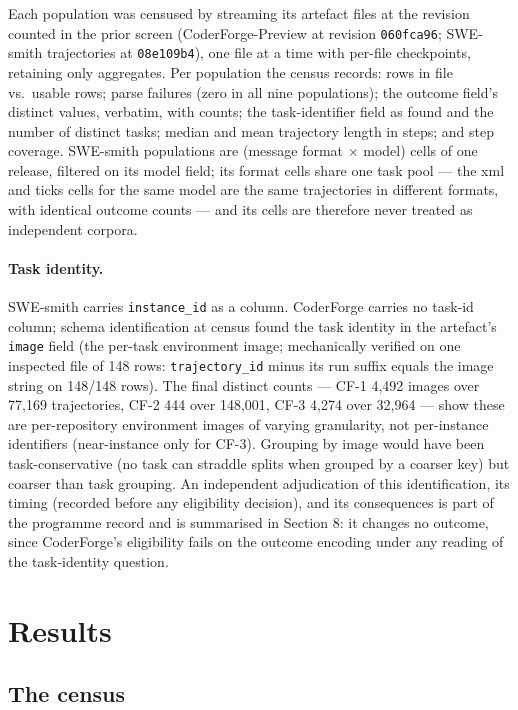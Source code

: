 \documentclass[11pt]{article}
\begin{document}
Each population was censused by streaming its artefact files at
the revision counted in the prior screen (CoderForge-Preview at
revision \texttt{060fca96}; SWE-smith trajectories at
\texttt{08e109b4}), one file at a time with per-file checkpoints,
retaining only aggregates. Per population the census records:
rows in file vs.\ usable rows; parse failures (zero in all nine
populations); the outcome field's distinct values, verbatim,
with counts; the task-identifier field as found and the number
of distinct tasks; median and mean trajectory length in steps;
and step coverage. SWE-smith populations are (message format
$\times$ model) cells of one release, filtered on its model
field; its format cells share one task pool --- the xml and
ticks cells for the same model are the same trajectories in
different formats, with identical outcome counts --- and its
cells are therefore never treated as independent corpora.

\paragraph{Task identity.} SWE-smith carries \texttt{instance\_id}
as a column. CoderForge carries no task-id column; schema
identification at census found the task identity in the
artefact's \texttt{image} field (the per-task environment image;
mechanically verified on one inspected file of 148 rows:
\texttt{trajectory\_id} minus its run suffix equals the image
string on 148/148 rows). The final distinct counts --- CF-1
4{,}492 images over 77{,}169 trajectories, CF-2 444 over
148{,}001, CF-3 4{,}274 over 32{,}964 --- show these are
per-repository environment images of varying granularity, not
per-instance identifiers (near-instance only for CF-3).
Grouping by image would have been task-conservative (no task
can straddle splits when grouped by a coarser key) but coarser
than task grouping. An independent adjudication of this
identification, its timing (recorded before any eligibility
decision), and its consequences is part of the programme record
and is summarised in Section 8: it changes no outcome, since
CoderForge's eligibility fails on the outcome encoding under
any reading of the task-identity question.

\section{Results}

\subsection{The census}
\end{document}
